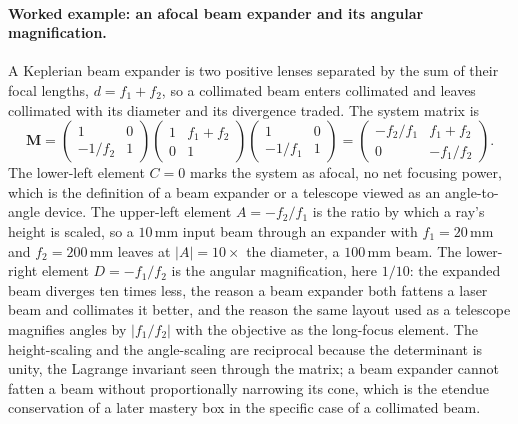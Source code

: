 \paragraph{Worked example: an afocal beam expander and its angular
magnification.} A Keplerian beam expander is two positive lenses separated by the
sum of their focal lengths, $d = f_1 + f_2$, so a collimated beam enters
collimated and leaves collimated with its diameter and its divergence traded. The
system matrix is
\[
\mathbf{M} = \begin{pmatrix} 1 & 0 \\ -1/f_2 & 1\end{pmatrix}
\begin{pmatrix} 1 & f_1 + f_2 \\ 0 & 1\end{pmatrix}
\begin{pmatrix} 1 & 0 \\ -1/f_1 & 1\end{pmatrix}
= \begin{pmatrix} -f_2/f_1 & f_1 + f_2 \\ 0 & -f_1/f_2\end{pmatrix}.
\]
The lower-left element $C = 0$ marks the system as afocal, no net focusing power,
which is the definition of a beam expander or a telescope viewed as an
angle-to-angle device. The upper-left element $A = -f_2/f_1$ is the ratio by which
a ray's height is scaled, so a $10\,\si{\milli\meter}$ input beam through an
expander with $f_1 = 20\,\si{\milli\meter}$ and $f_2 = 200\,\si{\milli\meter}$
leaves at $|A| = 10\times$ the diameter, a $100\,\si{\milli\meter}$ beam. The
lower-right element $D = -f_1/f_2$ is the angular magnification, here $1/10$: the
expanded beam diverges ten times less, the reason a beam expander both fattens a
laser beam and collimates it better, and the reason the same layout used as a
telescope magnifies angles by $|f_1/f_2|$ with the objective as the long-focus
element. The height-scaling and the angle-scaling are reciprocal because the
determinant is unity, the Lagrange invariant seen through the matrix; a beam
expander cannot fatten a beam without proportionally narrowing its cone, which is
the etendue conservation of a later mastery box in the specific case of a
collimated beam.

